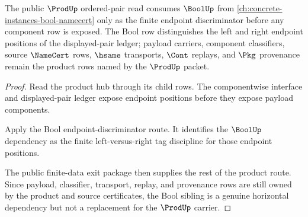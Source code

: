\begin{theorem}
\label{thm:prod-hub-bool-sibling-audit-link}
The public $\ProdUp$ ordered-pair read consumes $\BoolUp$ from \autoref{ch:concrete-instances-bool-namecert} only as the finite endpoint discriminator before any component row is exposed. The Bool row distinguishes the left and right endpoint positions of the displayed-pair ledger; payload carriers, component classifiers, source $\NameCert$ rows, $\hsame$ transports, $\Cont$ replays, and $\Pkg$ provenance remain the product rows named by the $\ProdUp$ packet.
\end{theorem}
\begin{proof}
Read the product hub through its child rows. The componentwise interface and displayed-pair ledger expose endpoint positions before they expose payload components.

Apply the Bool endpoint-discriminator route. It identifies the $\BoolUp$ dependency as the finite left-versus-right tag discipline for those endpoint positions.

The public finite-data exit package then supplies the rest of the product route. Since payload, classifier, transport, replay, and provenance rows are still owned by the product and source certificates, the Bool sibling is a genuine horizontal dependency but not a replacement for the $\ProdUp$ carrier.
\end{proof}
